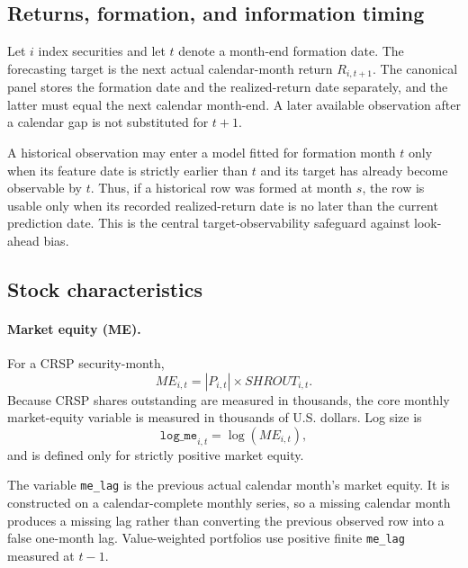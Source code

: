 \subsection{Returns, formation, and information timing}

Let $i$ index securities and let $t$ denote a month-end formation date. The forecasting target is the next actual calendar-month return $R_{i,t+1}$. The canonical panel stores the formation date and the realized-return date separately, and the latter must equal the next calendar month-end. A later available observation after a calendar gap is not substituted for $t+1$.

A historical observation may enter a model fitted for formation month $t$ only when its feature date is strictly earlier than $t$ and its target has already become observable by $t$. Thus, if a historical row was formed at month $s$, the row is usable only when its recorded realized-return date is no later than the current prediction date. This is the central target-observability safeguard against look-ahead bias.

\subsection{Stock characteristics}

\paragraph{Market equity (ME).}
For a CRSP security-month,
\begin{equation}
ME_{i,t}=|P_{i,t}|\times SHROUT_{i,t}.
\end{equation}
Because CRSP shares outstanding are measured in thousands, the core monthly market-equity variable is measured in thousands of U.S. dollars. Log size is
\begin{equation}
\texttt{log\_me}_{i,t}=\log(ME_{i,t}),
\end{equation}
and is defined only for strictly positive market equity.

The variable \texttt{me\_lag} is the previous actual calendar month's market equity. It is constructed on a calendar-complete monthly series, so a missing calendar month produces a missing lag rather than converting the previous observed row into a false one-month lag. Value-weighted portfolios use positive finite \texttt{me\_lag} measured at $t-1$.

